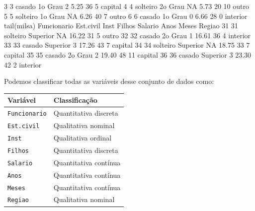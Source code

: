 \documentclass[
  10pt,
  a4paper]{book}
\newenvironment{Shaded}{\begin{snugshade}}{\end{snugshade}}
\newcommand{\ConstantTok}[1]{\textcolor[rgb]{0.00,0.00,0.00}{#1}}
\newcommand{\DecValTok}[1]{\textcolor[rgb]{0.00,0.00,0.81}{#1}}
\newcommand{\FloatTok}[1]{\textcolor[rgb]{0.00,0.00,0.81}{#1}}
\newcommand{\FunctionTok}[1]{\textcolor[rgb]{0.00,0.00,0.00}{#1}}
\newcommand{\NormalTok}[1]{#1}
\begin{document}
\begin{Shaded}
\begin{Highlighting}[]
\DecValTok{3}           \DecValTok{3}\NormalTok{    casado 1o Grau      }\DecValTok{2}    \FloatTok{5.25}   \DecValTok{36}     \DecValTok{5}\NormalTok{  capital}
\DecValTok{4}           \DecValTok{4}\NormalTok{  solteiro 2o Grau     }\ConstantTok{NA}    \FloatTok{5.73}   \DecValTok{20}    \DecValTok{10}\NormalTok{    outro}
\DecValTok{5}           \DecValTok{5}\NormalTok{  solteiro 1o Grau     }\ConstantTok{NA}    \FloatTok{6.26}   \DecValTok{40}     \DecValTok{7}\NormalTok{    outro}
\DecValTok{6}           \DecValTok{6}\NormalTok{    casado 1o Grau      }\DecValTok{0}    \FloatTok{6.66}   \DecValTok{28}     \DecValTok{0}\NormalTok{ interior}
\FunctionTok{tail}\NormalTok{(milsa)}
\NormalTok{   Funcionario Est.civil     Inst Filhos Salario Anos Meses   Regiao}
\DecValTok{31}          \DecValTok{31}\NormalTok{  solteiro Superior     }\ConstantTok{NA}   \FloatTok{16.22}   \DecValTok{31}     \DecValTok{5}\NormalTok{    outro}
\DecValTok{32}          \DecValTok{32}\NormalTok{    casado  2o Grau      }\DecValTok{1}   \FloatTok{16.61}   \DecValTok{36}     \DecValTok{4}\NormalTok{ interior}
\DecValTok{33}          \DecValTok{33}\NormalTok{    casado Superior      }\DecValTok{3}   \FloatTok{17.26}   \DecValTok{43}     \DecValTok{7}\NormalTok{  capital}
\DecValTok{34}          \DecValTok{34}\NormalTok{  solteiro Superior     }\ConstantTok{NA}   \FloatTok{18.75}   \DecValTok{33}     \DecValTok{7}\NormalTok{  capital}
\DecValTok{35}          \DecValTok{35}\NormalTok{    casado  2o Grau      }\DecValTok{2}   \FloatTok{19.40}   \DecValTok{48}    \DecValTok{11}\NormalTok{  capital}
\DecValTok{36}          \DecValTok{36}\NormalTok{    casado Superior      }\DecValTok{3}   \FloatTok{23.30}   \DecValTok{42}     \DecValTok{2}\NormalTok{ interior}
\end{Highlighting}
\end{Shaded}

Podemos classificar todas as variáveis desse conjunto de dados como:

\begin{longtable}[]{@{}ll@{}}
\toprule()
Variável & Classificação \\
\midrule()
\endhead
\texttt{Funcionario} & Quantitativa discreta \\
\texttt{Est.civil} & Qualitativa nominal \\
\texttt{Inst} & Qualitativa ordinal \\
\texttt{Filhos} & Quantitativa discreta \\
\texttt{Salario} & Quantitativa contínua \\
\texttt{Anos} & Quantitativa contínua \\
\texttt{Meses} & Quantitativa contínua \\
\texttt{Regiao} & Qualitativa nominal \\
\bottomrule()
\end{longtable}
\end{document}
